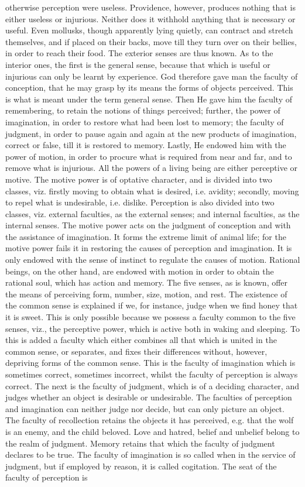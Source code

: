 \documentclass[12pt]{article}
\begin{document}
otherwise perception were useless. Providence, however, produces nothing that is either useless or injurious. Neither does it withhold anything that is necessary or useful. Even mollusks, though apparently lying quietly, can contract and stretch themselves, and if placed on their backs, move till they turn over on their bellies, in order to reach their food. The exterior senses are thus known. As to the interior ones, the first is the general sense, because that which is useful or injurious can only be learnt by experience. God therefore gave man the faculty of conception, that he may grasp by its means the forms of objects perceived. This is what is meant under the term general sense. Then He gave him the faculty of remembering, to retain the notions of things perceived; further, the power of imagination, in order to restore what had been lost to memory; the faculty of judgment, in order to pause again and again at the new products of imagination, correct or false, till it is restored to memory. Lastly, He endowed him with the power of motion, in order to procure what is required from near and far, and to remove what is injurious. All the powers of a living being are either perceptive or motive. The motive power is of optative character, and is divided into two classes, viz. firstly moving to obtain what is desired, i.e. avidity; secondly, moving to repel what is undesirable, i.e. dislike. Perception is also divided into two classes, viz. external faculties, as the external senses; and internal faculties, as the internal senses. The motive power acts on the judgment of conception and with the assistance of imagination. It forms the extreme limit of animal life; for the motive power fails it in restoring the causes of perception and imagination. It is only endowed with the sense of instinct to regulate the causes of motion. Rational beings, on the other hand, are endowed with motion in order to obtain the rational soul, which has action and memory. The five senses, as is known, offer the means of perceiving form, number, size, motion, and rest. The existence of the common sense is explained if we, for instance, judge when we find honey that it is sweet. This is only possible because we possess a faculty common to the five senses, viz., the perceptive power, which is active both in waking and sleeping. To this is added a faculty which either combines all that which is united in the common sense, or separates, and fixes their differences without, however, depriving forms of the common sense. This is the faculty of imagination which is sometimes correct, sometimes incorrect, whilst the faculty of perception is always correct. The next is the faculty of judgment, which is of a deciding character, and judges whether an object is desirable or undesirable. The faculties of perception and imagination can neither judge nor decide, but can only picture an object. The faculty of recollection retains the objects it has perceived, e.g. that the wolf is an enemy, and the child beloved. Love and hatred, belief and unbelief belong to the realm of judgment. Memory retains that which the faculty of judgment declares to be true. The faculty of imagination is so called when in the service of judgment, but if employed by reason, it is called cogitation. The seat of the faculty of perception is 
\end{document}
